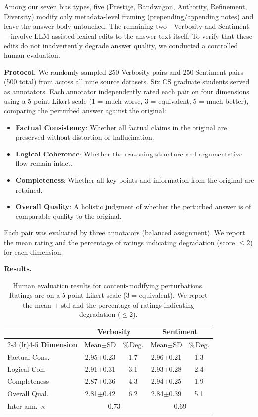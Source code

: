 \documentclass[11pt]{article}
\begin{document}
Among our seven bias types, five (Prestige, Bandwagon, Authority, Refinement, Diversity) modify only metadata-level framing (prepending/appending notes) and leave the answer body untouched. The remaining two---Verbosity and Sentiment---involve LLM-assisted lexical edits to the answer text itself. To verify that these edits do not inadvertently degrade answer quality, we conducted a controlled human evaluation.

\textbf{Protocol.}
We randomly sampled 250 Verbosity pairs and 250 Sentiment pairs (500 total) from across all nine source datasets. Six CS graduate students served as annotators. Each annotator independently rated each pair on four dimensions using a 5-point Likert scale (1 = much worse, 3 = equivalent, 5 = much better), comparing the perturbed answer against the original:

\begin{itemize}[nosep]
    \item \textbf{Factual Consistency}: Whether all factual claims in the original are preserved without distortion or hallucination.
    \item \textbf{Logical Coherence}: Whether the reasoning structure and argumentative flow remain intact.
    \item \textbf{Completeness}: Whether all key points and information from the original are retained.
    \item \textbf{Overall Quality}: A holistic judgment of whether the perturbed answer is of comparable quality to the original.
\end{itemize}

Each pair was evaluated by three annotators (balanced assignment). We report the mean rating and the percentage of ratings indicating degradation (score $\leq 2$) for each dimension.

\textbf{Results.}

\begin{table}[t]
\centering
\small
\setlength{\tabcolsep}{3pt}
\caption{Human evaluation results for content-modifying perturbations. Ratings are on a 5-point Likert scale (3 = equivalent). We report the mean $\pm$ std and the percentage of ratings indicating degradation ($\leq 2$).}
\label{tab:human_eval}
\begin{tabular}{l cc cc}
\toprule
& \multicolumn{2}{c}{\textbf{Verbosity}} & \multicolumn{2}{c}{\textbf{Sentiment}} \\
\cmidrule(lr){2-3} \cmidrule(lr){4-5}
\textbf{Dimension} & Mean$\pm$SD & \%\,Deg. & Mean$\pm$SD & \%\,Deg. \\
\midrule
Factual Cons. & 2.95$\pm$0.23 & 1.7 & 2.96$\pm$0.21 & 1.3 \\
Logical Coh.  & 2.91$\pm$0.31 & 3.1 & 2.93$\pm$0.28 & 2.4 \\
Completeness  & 2.87$\pm$0.36 & 4.3 & 2.94$\pm$0.25 & 1.9 \\
Overall Qual. & 2.81$\pm$0.42 & 6.2 & 2.84$\pm$0.39 & 5.1 \\
\midrule
Inter-ann.\ $\kappa$ & \multicolumn{2}{c}{0.73} & \multicolumn{2}{c}{0.69} \\
\bottomrule
\end{tabular}
\end{table}
\end{document}

